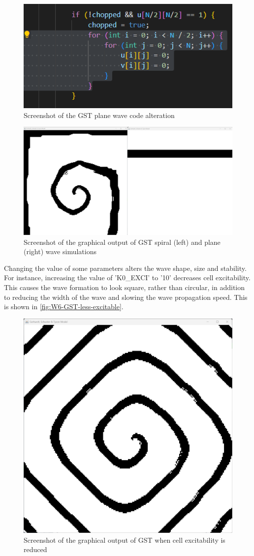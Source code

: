 \begin{figure}[H] 
    \centering
    \includegraphics[width=0.49\columnwidth]{Figures/Week 6/GST-plane-code.png}
    \caption{Screenshot of the GST plane wave code alteration}
    \label{fig:W6-GST-plane-code}
\end{figure}

\begin{figure}[H] 
    \centering
    \includegraphics[width=0.49\columnwidth]{Figures/Week 6/GST-side-by-side-output.png}
    \caption{Screenshot of the graphical output of GST spiral (left) and plane (right) wave simulations}
    \label{fig:W6-GST-side-by-side-output}
\end{figure}


Changing the value of some parameters alters the wave shape, size and stability. For instance, increasing the value of 'K0\_EXCI' to '10' decreases cell excitability. This causes the wave formation to look square, rather than circular, in addition to reducing the width of the wave and slowing the wave propagation speed. This is shown in \autoref{fig:W6-GST-less-excitable}.

\begin{figure}[H] 
    \centering
    \includegraphics[width=0.49\columnwidth]{Figures/Week 6/gst-square.png}
    \caption{Screenshot of the graphical output of GST when cell excitability is reduced}
    \label{fig:W6-GST-less-excitable}
\end{figure}


